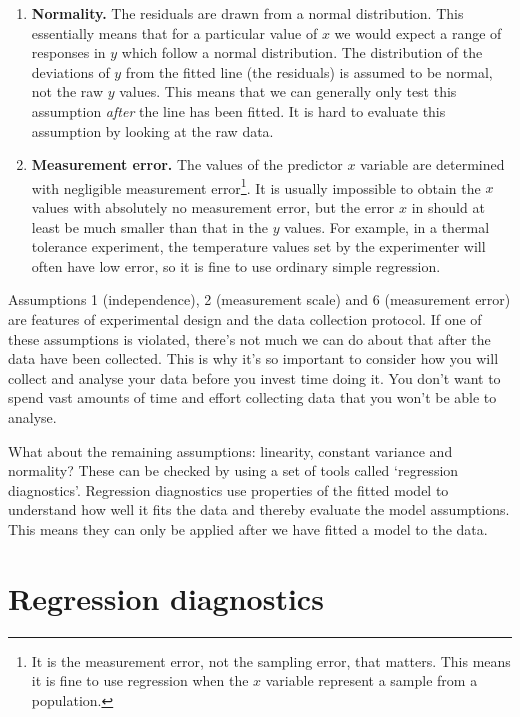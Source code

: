 \documentclass[
]{book}
\begin{document}
\begin{enumerate}
\item
  \textbf{Normality.} The residuals are drawn from a normal distribution. This essentially means that for a particular value of \(x\) we would expect a range of responses in \(y\) which follow a normal distribution. The distribution of the deviations of \(y\) from the fitted line (the residuals) is assumed to be normal, not the raw \(y\) values. This means that we can generally only test this assumption \emph{after} the line has been fitted. It is hard to evaluate this assumption by looking at the raw data.
\item
  \textbf{Measurement error.} The values of the predictor \(x\) variable are determined with negligible measurement error\footnote{It is the measurement error, not the sampling error, that matters. This means it is fine to use regression when the \(x\) variable represent a sample from a population.}. It is usually impossible to obtain the \(x\) values with absolutely no measurement error, but the error \(x\) in should at least be much smaller than that in the \(y\) values. For example, in a thermal tolerance experiment, the temperature values set by the experimenter will often have low error, so it is fine to use ordinary simple regression.
\end{enumerate}

Assumptions 1 (independence), 2 (measurement scale) and 6 (measurement error) are features of experimental design and the data collection protocol. If one of these assumptions is violated, there's not much we can do about that after the data have been collected. This is why it's so important to consider how you will collect and analyse your data before you invest time doing it. You don't want to spend vast amounts of time and effort collecting data that you won't be able to analyse.

What about the remaining assumptions: linearity, constant variance and normality? These can be checked by using a set of tools called `regression diagnostics'. Regression diagnostics use properties of the fitted model to understand how well it fits the data and thereby evaluate the model assumptions. This means they can only be applied after we have fitted a model to the data.

\hypertarget{regres-diagnose}{%
\section{Regression diagnostics}\label{regres-diagnose}}
\end{document}
